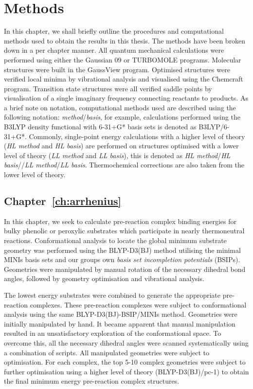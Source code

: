 
\chapter{Methods}
\label{ch:methods}

In this chapter, we shall briefly outline the procedures and computational
methods used to obtain the results in this thesis. The methods have been broken
down in a per chapter manner. All quantum mechanical calculations were performed
using either the Gaussian 09\cite{Frisch2009} or TURBOMOLE
programs.\cite{turbomole} Molecular structures were built in the GaussView
program.\cite{gview} Optimised structures were verified local minima by
vibrational analysis and visualised using the Chemcraft program.\cite{ccraft}
Transition state structures were all verified saddle points by visualisation of
a single imaginary frequency connecting reactants to products. As a brief note
on notation, computational methods used are described using the following
notation: \emph{method}/\emph{basis}, for example, calculations performed using
the B3LYP density functional with 6-31+G* basis sets is denoted as
B3LYP/6-31+G*. Commonly, single-point energy calculations with a higher level of
theory (\emph{HL method} and \emph{HL basis}) are performed on structures
optimised with a lower level of theory (\emph{LL method} and \emph{LL basis}),
this is denoted as \emph{HL method}/\emph{HL basis}//\emph{LL method}/\emph{LL
  basis}. Thermochemical corrections are also taken from the lower level of
theory.

\section{Chapter~\ref{ch:arrhenius}}

In this chapter, we seek to calculate pre-reaction complex binding energies for
bulky phenolic or peroxylic substrates which participate in nearly thermoneutral
reactions. Conformational analysis to locate the global minimum substrate
geometry was performed using the BLYP-D3(BJ)
method\cite{Becke1988,Lee1988,Grimme2010,Johnson2006} utilising the minimal
MINIs basis sets\cite{Huzinaga1984} and our groups own \emph{basis set
  incompletion potentials} (BSIPs). Geometries were
manipulated by manual rotation of the necessary dihedral bond angles, followed
by geometry optimisation and vibrational analysis.

The lowest energy substrates were combined to generate the appropriate
pre-reaction complexes. These pre-reaction complexes were subject to
conformational analysis using the same BLYP-D3(BJ)-BSIP/MINIs method. Geometries
were initially manipulated by hand. It became apparent that manual manipulation
resulted in an unsatisfactory exploration of the conformational space. To
overcome this, all the necessary dihedral angles were scanned systematically
using a combination of scripts.\cite{note5} All manipulated geometries were
subject to optimisation. For each complex, the top 5-10 complex geometries were
subject to further optimisation using a higher level of theory
(BLYP-D3(BJ)/pc-1) to obtain the final minimum energy pre-reaction complex
structures.

